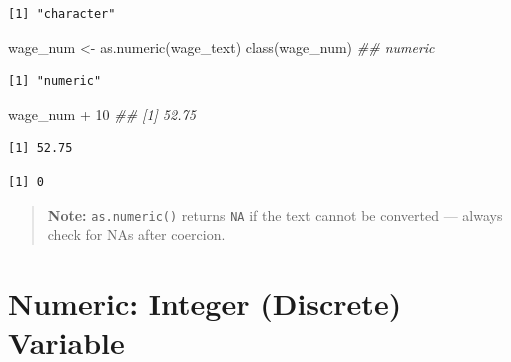 \documentclass[
  letterpaper,
  DIV=11,
  numbers=noendperiod]{scrreprt}
\newenvironment{Shaded}{\begin{snugshade}}{\end{snugshade}}
\newcommand{\CommentTok}[1]{\textcolor[rgb]{0.37,0.37,0.37}{#1}}
\newcommand{\DecValTok}[1]{\textcolor[rgb]{0.68,0.00,0.00}{#1}}
\newcommand{\DocumentationTok}[1]{\textcolor[rgb]{0.37,0.37,0.37}{\textit{#1}}}
\newcommand{\FunctionTok}[1]{\textcolor[rgb]{0.28,0.35,0.67}{#1}}
\newcommand{\NormalTok}[1]{\textcolor[rgb]{0.00,0.23,0.31}{#1}}
\newcommand{\OtherTok}[1]{\textcolor[rgb]{0.00,0.23,0.31}{#1}}
\newcommand{\SpecialCharTok}[1]{\textcolor[rgb]{0.37,0.37,0.37}{#1}}
\begin{document}
\begin{verbatim}
[1] "character"
\end{verbatim}

\begin{Shaded}
\begin{Highlighting}[]
\NormalTok{wage\_num }\OtherTok{\textless{}{-}} \FunctionTok{as.numeric}\NormalTok{(wage\_text)}
\FunctionTok{class}\NormalTok{(wage\_num)  }\DocumentationTok{\#\# \textquotesingle{}numeric\textquotesingle{}}
\end{Highlighting}
\end{Shaded}

\begin{verbatim}
[1] "numeric"
\end{verbatim}

\begin{Shaded}
\begin{Highlighting}[]
\NormalTok{wage\_num }\SpecialCharTok{+} \DecValTok{10}  \DocumentationTok{\#\# [1] 52.75}
\end{Highlighting}
\end{Shaded}

\begin{verbatim}
[1] 52.75
\end{verbatim}

\begin{Shaded}
\end{Shaded}

\begin{verbatim}
[1] 0
\end{verbatim}

\begin{quote}
\textbf{Note:} \texttt{as.numeric()} returns \texttt{NA} if the text
cannot be converted --- always check for NAs after coercion.
\end{quote}

\section{Numeric: Integer (Discrete)
Variable}\label{numeric-integer-discrete-variable}
\end{document}

